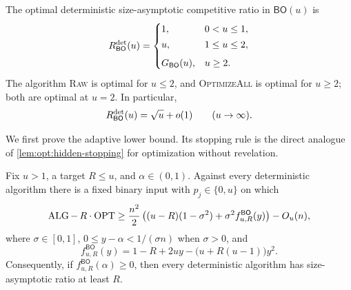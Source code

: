 \begin{theorem}
\label{thm:bo-det-curve}
The optimal deterministic size-asymptotic competitive ratio in
$\mathsf{BO}(u)$ is
\begin{equation}
 R_{\mathsf{BO}}^{\mathrm{det}}(u)=
 \begin{cases}
  1,&0<u\le1,\\[2pt]
  u,&1\le u\le2,\\[5pt]
  \displaystyle G_{\mathsf{BO}}(u),&u\ge2.
 \end{cases}
 \label{eq:bo-det-curve}
\end{equation}
The algorithm \textnormal{\textsc{Raw}} is optimal for $u\le2$, and
\textnormal{\textsc{OptimizeAll}} is optimal for $u\ge2$; both are optimal
at $u=2$.
In particular,
\begin{equation}
 R_{\mathsf{BO}}^{\mathrm{det}}(u)=\sqrt u+o(1)
 \qquad (u\to\infty).
 \label{eq:bo-det-asymptotic}
\end{equation}
\end{theorem}

We first prove the adaptive lower bound.  Its stopping rule is the direct
analogue of \cref{lem:opt:hidden-stopping} for optimization without
revelation.

\begin{lemma}
\label{lem:bo-det-hidden-stopping}
Fix $u>1$, a target $R\le u$, and $\alpha\in(0,1)$.  Against every
deterministic algorithm there is a fixed binary input with $p_j\in\{0,u\}$ on
which
\begin{equation}
 \operatorname{ALG}-\,R\cdot\operatorname{OPT}
 \ge \frac{n^2}{2}\left((u-R)(1-\sigma^2)
       +\sigma^2 f^{\mathsf{BO}}_{u,R}(y)\right)-O_u(n),
 \label{eq:bo-det-stopping-decomposition}
\end{equation}
where $\sigma\in[0,1]$, $0\le y-\alpha<1/(\sigma n)$ when
$\sigma>0$, and
\begin{equation}
 f^{\mathsf{BO}}_{u,R}(y)
 =1-R+2uy-\bigl(u+R(u-1)\bigr)y^2.
 \label{eq:bo-det-stopping-f}
\end{equation}
Consequently, if $f^{\mathsf{BO}}_{u,R}(\alpha)\ge0$, then every
deterministic algorithm has size-asymptotic ratio at least $R$.
\end{lemma}

